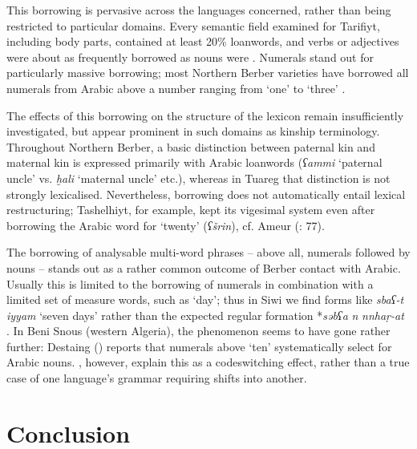 \documentclass[output=paper]{langsci/langscibook}
\begin{document}
This borrowing is pervasive across the languages concerned, rather than being restricted to particular domains. Every semantic field examined for Tarifiyt, including body parts, contained at least 20\% loanwords, and verbs or adjectives were about as frequently borrowed as nouns were \citep{Kossmann2009}. Numerals stand out for particularly massive borrowing; most Northern Berber varieties have borrowed all numerals from Arabic above a number ranging from `one' to `three' \citep{Souag2007}.

The effects of this borrowing on the structure of the lexicon remain insufficiently investigated, but appear prominent in such domains as kinship terminology. Throughout Northern Berber, a basic distinction between paternal kin and maternal kin is expressed primarily with Arabic loanwords (\textit{ʕammi} `paternal uncle' vs. \textit{ḫali} `maternal uncle' etc.), whereas in Tuareg that distinction is not strongly lexicalised. Nevertheless, borrowing does not automatically entail lexical restructuring; Tashelhiyt, for example, kept its vigesimal system even after borrowing the Arabic word for `twenty' (\textit{ʕšrin}), cf. Ameur (\citeyear{Ameur2008}: 77).

The borrowing of analysable multi-word phrases – above all, numerals followed by nouns – stands out as a rather common outcome of Berber contact with Arabic. Usually this is limited to the borrowing of numerals in combination with a limited set of measure words, such as `day'; thus in Siwi we find forms like \textit{sbaʕ-t} \textit{iyyam} `seven days' rather than the expected regular formation *\textit{səbʕa} \textit{n} \textit{nnhaṛ-at }\citep[114]{Souag2013book}. In Beni Snous (western Algeria), the phenomenon seems to have gone rather further: Destaing (\citeyear[212]{Destaing1907}) reports that numerals above `ten' systematically select for Arabic nouns.  \citet{SouagKherbache2016}, however, explain this as a codeswitching effect, rather than a true case of one language's grammar requiring shifts into another.

\section{Conclusion}
\end{document}
